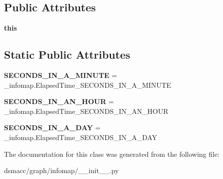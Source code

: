 \subsection*{Public Attributes}
\begin{DoxyCompactItemize}
\item 
\mbox{\label{classdsmacc_1_1graph_1_1infomap_1_1ElapsedTime_ac94badc32f91dfe6077ec7f623e8b3a4}} 
{\bfseries this}
\end{DoxyCompactItemize}
\subsection*{Static Public Attributes}
\begin{DoxyCompactItemize}
\item 
\mbox{\label{classdsmacc_1_1graph_1_1infomap_1_1ElapsedTime_a4c24181b4598d1af2346aaa1dbcc4b55}} 
{\bfseries S\+E\+C\+O\+N\+D\+S\+\_\+\+I\+N\+\_\+\+A\+\_\+\+M\+I\+N\+U\+TE} = \+\_\+infomap.\+Elapsed\+Time\+\_\+\+S\+E\+C\+O\+N\+D\+S\+\_\+\+I\+N\+\_\+\+A\+\_\+\+M\+I\+N\+U\+TE
\item 
\mbox{\label{classdsmacc_1_1graph_1_1infomap_1_1ElapsedTime_a9623995cb45b1aef9c81346943298747}} 
{\bfseries S\+E\+C\+O\+N\+D\+S\+\_\+\+I\+N\+\_\+\+A\+N\+\_\+\+H\+O\+UR} = \+\_\+infomap.\+Elapsed\+Time\+\_\+\+S\+E\+C\+O\+N\+D\+S\+\_\+\+I\+N\+\_\+\+A\+N\+\_\+\+H\+O\+UR
\item 
\mbox{\label{classdsmacc_1_1graph_1_1infomap_1_1ElapsedTime_acc186c49d602694136beb1d6cd053806}} 
{\bfseries S\+E\+C\+O\+N\+D\+S\+\_\+\+I\+N\+\_\+\+A\+\_\+\+D\+AY} = \+\_\+infomap.\+Elapsed\+Time\+\_\+\+S\+E\+C\+O\+N\+D\+S\+\_\+\+I\+N\+\_\+\+A\+\_\+\+D\+AY
\end{DoxyCompactItemize}


The documentation for this class was generated from the following file\+:\begin{DoxyCompactItemize}
\item 
dsmacc/graph/infomap/\+\_\+\+\_\+init\+\_\+\+\_\+.\+py\end{DoxyCompactItemize}
